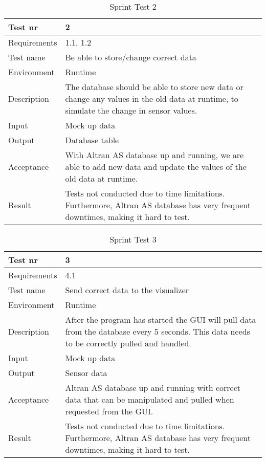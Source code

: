 \documentclass[../document]{subfiles}
\begin{document}
\begin{table}[H]
\caption{Sprint Test 2}
\centering
\begin{tabularx}{\textwidth}{|l|X|}
\hline
Test nr
&2
\\ \hline Requirements
&1.1, 1.2
\\ \hline Test name
&Be able to store/change correct data
\\ \hline Environment
&Runtime
\\ \hline Description
&The database should be able to store new data or change any values in the old data at runtime, to simulate the change in sensor values.
\\ \hline Input
&Mock up data
\\ \hline Output
&Database table
\\ \hline Acceptance
&With Altran AS database up and running, we are able to add new data and update the values of the old data at runtime.
\\ \hline Result
&Tests not conducted due to time limitations. Furthermore, Altran AS database has very frequent downtimes, making it hard to test.
\\ \hline 
\end{tabularx}
\end{table}

\begin{table}[H]
\caption{Sprint Test 3}
\centering
\begin{tabularx}{\textwidth}{|l|X|}
\hline
Test nr
&3
\\ \hline Requirements
&4.1
\\ \hline Test name
&Send correct data to the visualizer
\\ \hline Environment
&Runtime
\\ \hline Description
&After the program has started the GUI will pull data from the database every 5 seconds. This data needs to be correctly pulled and handled.
\\ \hline Input
&Mock up data
\\ \hline Output
&Sensor data
\\ \hline Acceptance
&Altran AS database up and running with correct data that can be manipulated and pulled when requested from the GUI. 
\\ \hline Result
&Tests not conducted due to time limitations. Furthermore, Altran AS database has very frequent downtimes, making it hard to test.
\\ \hline 
\end{tabularx}
\end{table}
\end{document}
